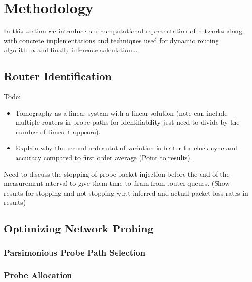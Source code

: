 \chapter{Methodology}
\label{cha:methodology}
In this section we introduce our computational representation of networks along with concrete implementations and techniques used for dynamic routing algorithms and finally inference calculation...

\section{Router Identification}
\label{sec:Maddtomography}
Todo:
\begin{itemize}
    \item Tomography as a linear system with a linear solution (note can include multiple routers in probe paths for identifiability just need to divide by the number of times it appears).
    \item Explain why the second order stat of variation is better for clock sync and accuracy compared to first order average (Point to results).
\end{itemize}

Need to discuss the stopping of probe packet injection before the end of the measurement interval to give them time to drain from router queues. (Show results for stopping and not stopping w.r.t inferred and actual packet loss rates in results)

\section{Optimizing Network Probing}
\label{sec:Moptprobing}
\subsection{Parsimonious Probe Path Selection}
\label{ssec:Mpppselection}

\subsection{Probe Allocation}
\label{ssec:Mpallocation}

